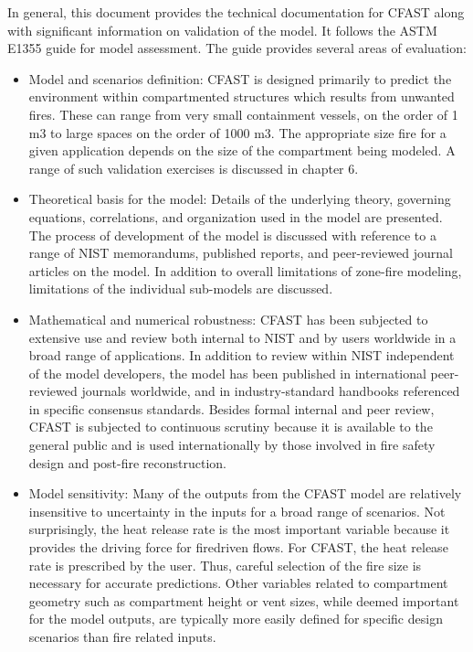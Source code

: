 \documentclass[12pt]{book}
\begin{document}
In general, this document provides the technical documentation for CFAST along with
significant information on validation of the model. It follows the ASTM E1355 guide for model
assessment. The guide provides several areas of evaluation:

\begin{itemize}
\item Model and scenarios definition: CFAST is designed primarily to predict the
environment within compartmented structures which results from unwanted fires. These
can range from very small containment vessels, on the order of 1 m3 to large spaces on
the order of 1000 m3. The appropriate size fire for a given application depends on the size
of the compartment being modeled. A range of such validation exercises is discussed in
chapter 6.

\item Theoretical basis for the model: Details of the underlying theory, governing equations,
correlations, and organization used in the model are presented. The process of
development of the model is discussed with reference to a range of NIST memorandums,
published reports, and peer-reviewed journal articles on the model. In addition to overall
limitations of zone-fire modeling, limitations of the individual sub-models are discussed.

\item Mathematical and numerical robustness: CFAST has been subjected to extensive use
and review both internal to NIST and by users worldwide in a broad range of
applications. In addition to review within NIST independent of the model developers, the
model has been published in international peer-reviewed journals worldwide, and in
industry-standard handbooks referenced in specific consensus standards. Besides formal
internal and peer review, CFAST is subjected to continuous scrutiny because it is
available to the general public and is used internationally by those involved in fire safety
design and post-fire reconstruction.

\item Model sensitivity: Many of the outputs from the CFAST model are relatively insensitive
to uncertainty in the inputs for a broad range of scenarios. Not surprisingly, the heat
release rate is the most important variable because it provides the driving force for firedriven
flows. For CFAST, the heat release rate is prescribed by the user. Thus, careful
selection of the fire size is necessary for accurate predictions. Other variables related to
compartment geometry such as compartment height or vent sizes, while deemed
important for the model outputs, are typically more easily defined for specific design
scenarios than fire related inputs.


\end{itemize}
\end{document}
